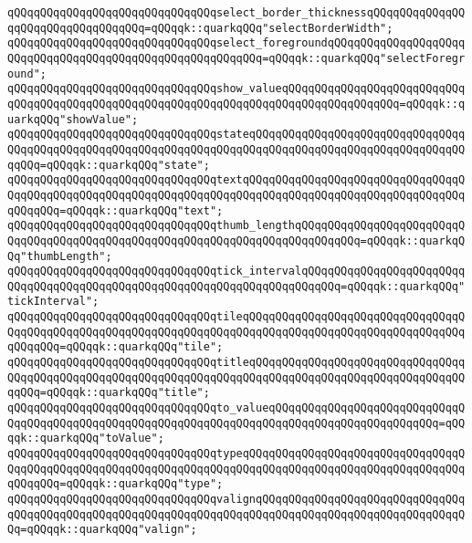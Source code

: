 \verb|qQQqqQQqqQQqqQQqqQQqqQQqqQQqqQQqselect_border_thicknessqQQqqQQqqQQqqQQqqQQqqQQqqQQqqQQqqQQq=qQQqqk::quarkqQQq"selectBorderWidth";|\newline
\verb|qQQqqQQqqQQqqQQqqQQqqQQqqQQqqQQqselect_foregroundqQQqqQQqqQQqqQQqqQQqqQQqqQQqqQQqqQQqqQQqqQQqqQQqqQQqqQQqqQQq=qQQqqk::quarkqQQq"selectForeground";|\newline
\verb|qQQqqQQqqQQqqQQqqQQqqQQqqQQqqQQqshow_valueqQQqqQQqqQQqqQQqqQQqqQQqqQQqqQQqqQQqqQQqqQQqqQQqqQQqqQQqqQQqqQQqqQQqqQQqqQQqqQQqqQQqqQQq=qQQqqk::quarkqQQq"showValue";|\newline
\verb|qQQqqQQqqQQqqQQqqQQqqQQqqQQqqQQqstateqQQqqQQqqQQqqQQqqQQqqQQqqQQqqQQqqQQqqQQqqQQqqQQqqQQqqQQqqQQqqQQqqQQqqQQqqQQqqQQqqQQqqQQqqQQqqQQqqQQqqQQqqQQq=qQQqqk::quarkqQQq"state";|\newline
\verb|qQQqqQQqqQQqqQQqqQQqqQQqqQQqqQQqtextqQQqqQQqqQQqqQQqqQQqqQQqqQQqqQQqqQQqqQQqqQQqqQQqqQQqqQQqqQQqqQQqqQQqqQQqqQQqqQQqqQQqqQQqqQQqqQQqqQQqqQQqqQQqqQQq=qQQqqk::quarkqQQq"text";|\newline
\verb|qQQqqQQqqQQqqQQqqQQqqQQqqQQqqQQqthumb_lengthqQQqqQQqqQQqqQQqqQQqqQQqqQQqqQQqqQQqqQQqqQQqqQQqqQQqqQQqqQQqqQQqqQQqqQQqqQQqqQQq=qQQqqk::quarkqQQq"thumbLength";|\newline
\verb|qQQqqQQqqQQqqQQqqQQqqQQqqQQqqQQqtick_intervalqQQqqQQqqQQqqQQqqQQqqQQqqQQqqQQqqQQqqQQqqQQqqQQqqQQqqQQqqQQqqQQqqQQqqQQqqQQq=qQQqqk::quarkqQQq"tickInterval";|\newline
\verb|qQQqqQQqqQQqqQQqqQQqqQQqqQQqqQQqtileqQQqqQQqqQQqqQQqqQQqqQQqqQQqqQQqqQQqqQQqqQQqqQQqqQQqqQQqqQQqqQQqqQQqqQQqqQQqqQQqqQQqqQQqqQQqqQQqqQQqqQQqqQQqqQQq=qQQqqk::quarkqQQq"tile";|\newline
\verb|qQQqqQQqqQQqqQQqqQQqqQQqqQQqqQQqtitleqQQqqQQqqQQqqQQqqQQqqQQqqQQqqQQqqQQqqQQqqQQqqQQqqQQqqQQqqQQqqQQqqQQqqQQqqQQqqQQqqQQqqQQqqQQqqQQqqQQqqQQqqQQq=qQQqqk::quarkqQQq"title";|\newline
\verb|qQQqqQQqqQQqqQQqqQQqqQQqqQQqqQQqto_valueqQQqqQQqqQQqqQQqqQQqqQQqqQQqqQQqqQQqqQQqqQQqqQQqqQQqqQQqqQQqqQQqqQQqqQQqqQQqqQQqqQQqqQQqqQQqqQQq=qQQqqk::quarkqQQq"toValue";|\newline
\verb|qQQqqQQqqQQqqQQqqQQqqQQqqQQqqQQqtypeqQQqqQQqqQQqqQQqqQQqqQQqqQQqqQQqqQQqqQQqqQQqqQQqqQQqqQQqqQQqqQQqqQQqqQQqqQQqqQQqqQQqqQQqqQQqqQQqqQQqqQQqqQQqqQQq=qQQqqk::quarkqQQq"type";|\newline
\verb|qQQqqQQqqQQqqQQqqQQqqQQqqQQqqQQqvalignqQQqqQQqqQQqqQQqqQQqqQQqqQQqqQQqqQQqqQQqqQQqqQQqqQQqqQQqqQQqqQQqqQQqqQQqqQQqqQQqqQQqqQQqqQQqqQQqqQQqqQQq=qQQqqk::quarkqQQq"valign";|\newline
